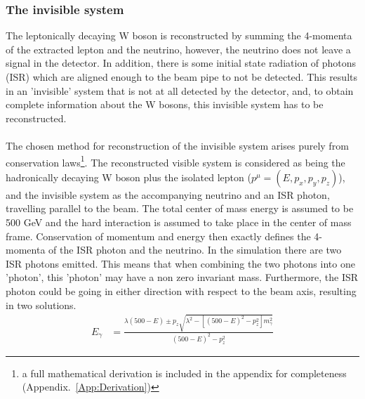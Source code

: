 \subsubsection{The invisible system}
\label{SUBSUBSEC:ISRImplementation}
The leptonically decaying W boson is reconstructed by summing the 4-momenta of the extracted lepton and the neutrino, however, the neutrino does not leave a signal in the detector. In addition, there is some initial state radiation of photons (ISR) which are aligned enough to the beam pipe to not be detected. This results in an 'invisible' system that is not at all detected by the detector, and, to obtain complete information about the W bosons, this invisible system has to be reconstructed.
\\\\
The chosen method for reconstruction of the invisible system arises purely from conservation laws\footnote{ a full mathematical derivation is included in the appendix for completeness (Appendix.~\ref{App:Derivation})}. The reconstructed visible system is considered as being the hadronically decaying W boson plus the isolated lepton (${p}^{\mu} = ( E,  {p}_{x}, {p}_{y}, {p}_{z})$), and the invisible system as the accompanying neutrino and an ISR photon, travelling parallel to the beam. The total center of mass energy is assumed to be 500 GeV and the hard interaction is assumed to take place in the center of mass frame. Conservation of momentum and energy then exactly defines the 4-momenta of the ISR photon and the neutrino. In the simulation there are two ISR photons emitted. This means that when combining the two photons into one 'photon', this 'photon' may have a non zero invariant mass. Furthermore, the ISR photon could be going in either direction with respect to the beam axis, resulting in two solutions.
\begin{align}
\label{EQ:Full}
{E}_{\gamma}    &= \frac{{\lambda}(500 - E)  \pm {p}_{z}\sqrt{ {\lambda}^{2} - [{(500 - E)}^{2} -{p}_{z}^{2}]{m}_{\gamma}^{2}}}{{(500 - E)}^{2} -   {p}_{z}^{2}}
   \end{align}

